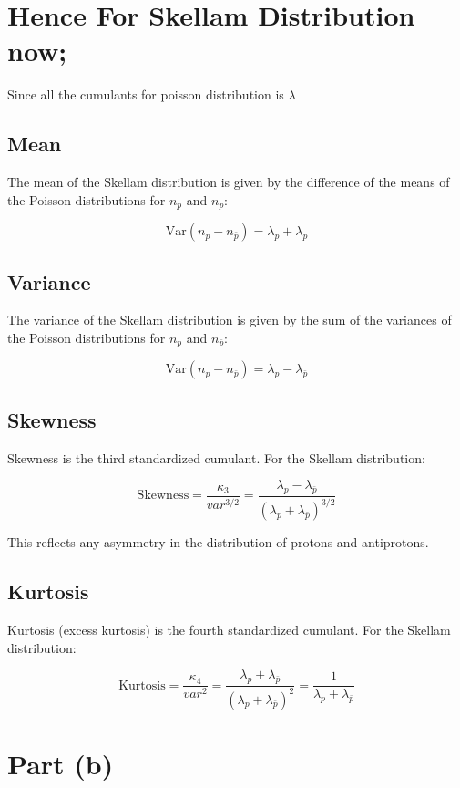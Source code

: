 \documentclass[11pt]{article}
\begin{document}
		\section*{Hence For Skellam Distribution now;}
		Since all the cumulants for poisson distribution is \(\lambda\)	
		\subsection*{Mean}
		The mean of the Skellam distribution is given by the difference of the means of the Poisson distributions for \( n_p \) and \( n_{\bar{p}} \):
		
		\[
		\text{Var}(n_p - n_{\bar{p}}) = \lambda_p + \lambda_{\bar{p}}
		\]
		
		\subsection*{Variance}
		The variance of the Skellam distribution is given by the sum of the variances of the Poisson distributions for \( n_p \) and \( n_{\bar{p}} \):
		
		\[
		\text{Var}(n_p - n_{\bar{p}}) = \lambda_p - \lambda_{\bar{p}}
		\]
		
		\subsection*{Skewness}
		Skewness is the third standardized cumulant. For the Skellam distribution:
		
		\[
		\text{Skewness} = \frac{\kappa_3}{var^{3/2}} = \frac{\lambda_p - \lambda_{\bar{p}}}{(\lambda_p + \lambda_{\bar{p}})^{3/2}}
		\]
		
		This reflects any asymmetry in the distribution of protons and antiprotons.
		
		\subsection*{Kurtosis}
		Kurtosis (excess kurtosis) is the fourth standardized cumulant. For the Skellam distribution:
		
		\[
		\text{Kurtosis} =\frac{\kappa_4}{var^2}=\frac{\lambda_p + \lambda_{\bar{p}}}{(\lambda_p + \lambda_{\bar{p}})^2} = \frac{1}{\lambda_p + \lambda_{\bar{p}}}
		\]
		
		\section*{Part (b)}
		
\end{document}
